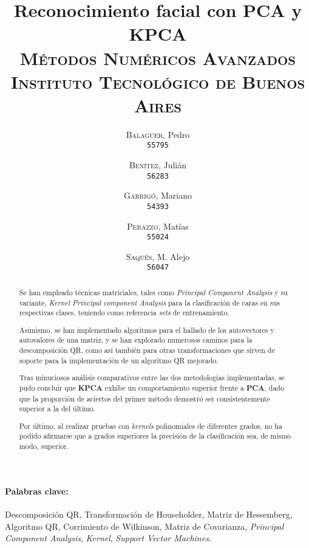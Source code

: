 \documentclass[12pt, twocolumn]{article}
\begin{document}
	\title{Reconocimiento facial con PCA y KPCA \\ 
		   \large{\textsc{Métodos Numéricos Avanzados}} \\
		   \normalsize{\textsc{Instituto Tecnológico de Buenos Aires}}}
	\author{
		\textsc{Balaguer}, Pedro \\
		\texttt{55795}
		\and
		\textsc{Benítez}, Julián \\
		\texttt{56283}
		\and
		\textsc{Garrigó}, Mariano \\
		\texttt{54393}
		\and
		\textsc{Perazzo}, Matías \\
		\texttt{55024}
		\and
		\textsc{Saqués}, M. Alejo \\
		\texttt{56047} 
	}
	\date{}
	\maketitle
	
	\begin{abstract}
		Se han empleado técnicas matriciales, tales como \textit{Principal Component Analysis} y su variante, \textit{Kernel Principal component Analysis} para la clasificación de caras en sus respectivas clases, teniendo como referencia \textit{sets} de entrenamiento.  
		
		Asimismo, se han implementado algoritmos para el hallado de los autovectores y autovalores de una matriz, y se han explorado numerosos caminos para la descomposición QR, como así también para otras transformaciones que sirven de soporte para la implementación de un algoritmo QR mejorado.   
		
		Tras minuciosos análisis comparativos entre las dos metodologías implementadas, se pudo concluir que \textbf{KPCA} exhibe un comportamiento superior frente a \textbf{PCA}, dado que la proporción de aciertos del primer método demostró ser consistentemente superior a la del último.
		
		Por último, al realizar pruebas con \textit{kernels} polinomiales de diferentes grados, no ha podido afirmarse que a grados superiores la precisión de la clasificación sea, de mismo modo, superior.  
	\end{abstract}
	
	\paragraph{Palabras clave:} Descomposición QR, Transformación de Householder, Matriz de Hessemberg, Algoritmo QR, Corrimiento de Wilkinson, Matriz de Covarianza, \textit{Principal Component Analysis}, \textit{Kernel}, \textit{Support Vector Machines}.
	
\end{document}
